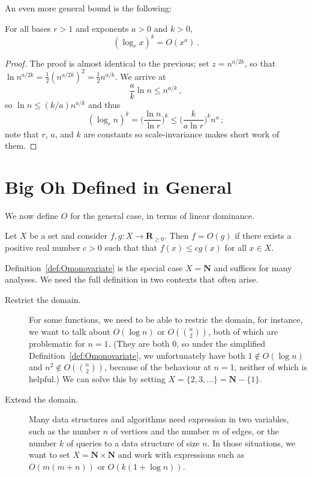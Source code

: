 \documentclass{tstextbook}
\begin{document}
An even more general bound is the following:

\begin{theorem}
  For all  bases \(r> 1\) and exponents \(a>0\) and \(k> 0\), \[ (\log_r x)^k = O(x^a)\,.\]
\end{theorem}

\begin{proof}
  The proof is almost identical to the previous; set $z=n^{a/2k}$, so that 
  $\ln n^{a/2k} = \frac12(n^{a/2k})^2 = \frac12 n^{a/k}$.
  We arrive at \[ \frac{a}{k} \ln n \leq n^{a/k}\,,\]
  so $\ln n \leq (k/a)n^{a/k}$ and thus 
  \[ (\log_r n)^k = \bigl(\frac{\ln n}{\ln r}\bigr)^k \leq  \bigl(\frac{k}{a\ln r}\bigr)^k n^a\,;\]
  note that $r$, $a$, and $k$ are constants so scale-invariance makes short work of them.
\end{proof}


\section{Big Oh Defined in General}

We now define $O$ for the general case, in terms of linear dominance.

\begin{definition}%
  \label{def:Olineardominance}
  Let $X$ be a set and consider $f, g\colon X\rightarrow \mathbf R_{\geq 0}$.
Then $f= O(g)$ if there exists a positive real number $c>0$  such that
that \( f(x)\leq cg(x)\) for all $x\in X$.
\end{definition}

Definition~\ref{def:Omonovariate} is the special case $X=\mathbf N$ and suffices for many analyses.
We need the full definition in two contexts that often arise.

\begin{description}
    \item [Restrict the domain.] For some functions, we need to be able to restric the domain, for instance, we want to talk about $O(\log n)$ or $O(\binom{n}{2})$, both of which are problematic for $n=1$.
      (They are both $0$, so under the simplified Definition~\ref{def:Omonovariate}, we unfortunately have both $1\notin O(\log n)$ and $n^2\notin O(\binom{n}{2})$, because of the behaviour at $n=1$, neither of which is helpful.)
      We can solve this by setting $X=\{2,3,\dots\} = \mathbf N-\{1\}$.
    \item [Extend the domain.] Many data structures and algorithms need expression in two variables, such as the number $n$ of vertices and the number $m$ of edges, or the number $k$ of queries to a data structure of size $n$.
      In those situations, we want to set $X=\mathbf N\times \mathbf N$ and work with expressions such as $O(m(m+n))$ or $O(k(1 + \log n))$.
\end{description}
\end{document}
